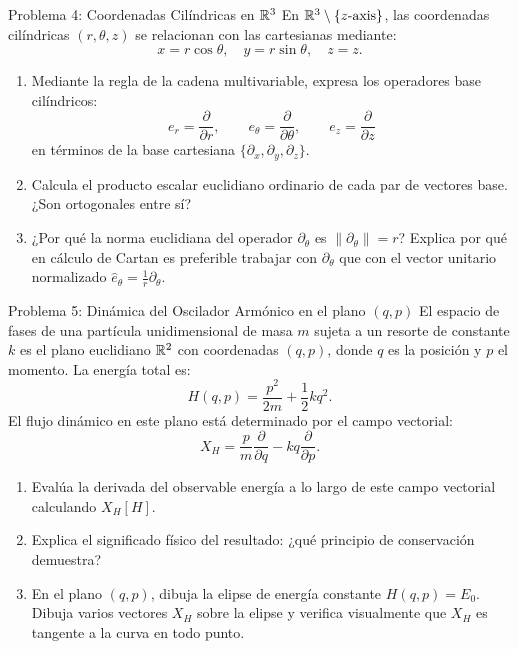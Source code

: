 \documentclass[11pt,letterpaper]{article}
\begin{document}
\begin{infobox}{Problema 4: Coordenadas Cilíndricas en $\mathbb{R}^3$}
En $\mathbb{R}^3 \setminus \{z\text{-axis}\}$, las coordenadas cilíndricas $(r, \theta, z)$ se relacionan con las cartesianas mediante:
\[
x = r\cos\theta, \quad y = r\sin\theta, \quad z = z.
\]
\begin{enumerate}[label=\alph*)]
    \item Mediante la regla de la cadena multivariable, expresa los operadores base cilíndricos:
    \[
    e_r = \frac{\partial}{\partial r}, \qquad e_\theta = \frac{\partial}{\partial \theta}, \qquad e_z = \frac{\partial}{\partial z}
    \]
    en términos de la base cartesiana $\{\partial_x, \partial_y, \partial_z\}$.
    \item Calcula el producto escalar euclidiano ordinario de cada par de vectores base. ¿Son ortogonales entre sí?
    \item ¿Por qué la norma euclidiana del operador $\partial_\theta$ es $\|\partial_\theta\| = r$? Explica por qué en cálculo de Cartan es preferible trabajar con $\partial_\theta$ que con el vector unitario normalizado $\hat{e}_\theta = \frac{1}{r}\partial_\theta$.
\end{enumerate}
\end{infobox}


\begin{infobox}{Problema 5: Dinámica del Oscilador Armónico en el plano $(q, p)$}
El espacio de fases de una partícula unidimensional de masa $m$ sujeta a un resorte de constante $k$ es el plano euclidiano $\mathbb{R}^2$ con coordenadas $(q, p)$, donde $q$ es la posición y $p$ el momento. La energía total es:
\[
H(q, p) = \frac{p^2}{2m} + \frac{1}{2} k q^2.
\]
El flujo dinámico en este plano está determinado por el campo vectorial:
\[
X_H = \frac{p}{m} \frac{\partial}{\partial q} - kq \frac{\partial}{\partial p}.
\]
\begin{enumerate}[label=\alph*)]
    \item Evalúa la derivada del observable energía a lo largo de este campo vectorial calculando $X_H[H]$.
    \item Explica el significado físico del resultado: ¿qué principio de conservación demuestra?
    \item En el plano $(q, p)$, dibuja la elipse de energía constante $H(q, p) = E_0$. Dibuja varios vectores $X_H$ sobre la elipse y verifica visualmente que $X_H$ es tangente a la curva en todo punto.
\end{enumerate}
\end{infobox}
\end{document}
